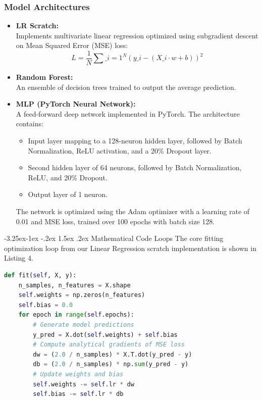 \documentclass[12pt,a4paper]{article}
\makeatletter
\renewcommand\paragraph{\@startsection{paragraph}{4}{\z@}%
  {-3.25ex\@plus -1ex \@minus -.2ex}%
  {1.5ex \@plus .2ex}%
  {\normalfont\normalsize\bfseries}}
\makeatother
\begin{document}
\subsubsection{Model Architectures}
\begin{itemize}
    \item \textbf{LR Scratch:}\mbox{}\\ Implements multivariate linear regression optimized using subgradient descent on Mean Squared Error (MSE) loss:
        \[
        L = \frac{1}{N} \sum\_{i=1}^{N} \left( y\_i - (X\_i \cdot w + b) \right)^2
        \]
    \item \textbf{Random Forest:}\mbox{}\\ An ensemble of decision trees trained to output the average prediction.
    \item \textbf{MLP (PyTorch Neural Network):}\mbox{}\\ A feed-forward deep network implemented in PyTorch. The architecture contains:
        \begin{itemize}
            \item Input layer mapping to a 128-neuron hidden layer, followed by Batch Normalization, ReLU activation, and a 20\% Dropout layer.
            \item Second hidden layer of 64 neurons, followed by Batch Normalization, ReLU, and 20\% Dropout.
            \item Output layer of 1 neuron.
        \end{itemize}
        The network is optimized using the Adam optimizer with a learning rate of 0.01 and MSE loss, trained over 100 epochs with batch size 128.
\end{itemize}

\paragraph{Mathematical Code Loops}
The core fitting optimization loop from our Linear Regression scratch implementation is shown in Listing 4.
\begin{lstlisting}[language=Python, caption=Linear Regression Scratch Core Fitting Loop]
def fit(self, X, y):
    n_samples, n_features = X.shape
    self.weights = np.zeros(n_features)
    self.bias = 0.0
    for epoch in range(self.epochs):
        # Generate model predictions
        y_pred = X.dot(self.weights) + self.bias
        # Compute analytical gradients of MSE loss
        dw = (2.0 / n_samples) * X.T.dot(y_pred - y)
        db = (2.0 / n_samples) * np.sum(y_pred - y)
        # Update weights and bias
        self.weights -= self.lr * dw
        self.bias -= self.lr * db
\end{lstlisting}
\end{document}
